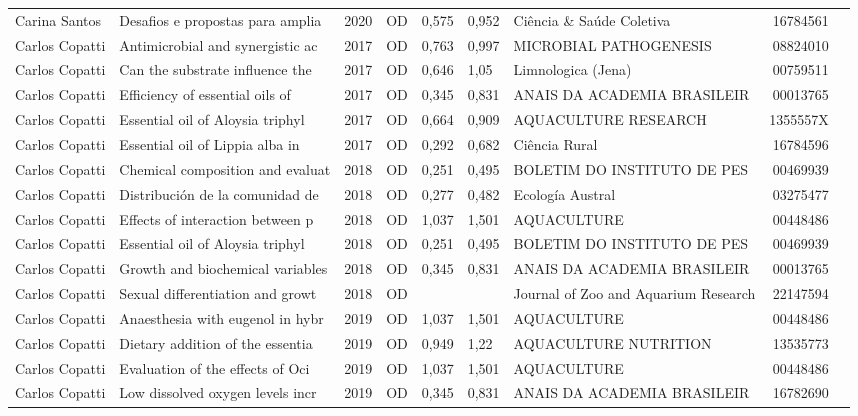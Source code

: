 \documentclass[12pt,brazil]{article}\usepackage[]{graphicx}\usepackage[]{xcolor}
\begin{document}
\begin{longtable}{lllrrllrr}
Carina Santos & Desafios e propostas para amplia & 2020 & OD & 0,575 & 0,952 & Ciência \& Saúde Coletiva & 16784561 \\
Carlos Copatti & Antimicrobial and synergistic ac & 2017 & OD & 0,763 & 0,997 & MICROBIAL PATHOGENESIS & 08824010 \\
Carlos Copatti & Can the substrate influence the  & 2017 & OD & 0,646 & 1,05 & Limnologica (Jena) & 00759511 \\
Carlos Copatti & Efficiency of essential oils of  & 2017 & OD & 0,345 & 0,831 & ANAIS DA ACADEMIA BRASILEIR & 00013765 \\
Carlos Copatti & Essential oil of Aloysia triphyl & 2017 & OD & 0,664 & 0,909 & AQUACULTURE RESEARCH & 1355557X \\
Carlos Copatti & Essential oil of Lippia alba in  & 2017 & OD & 0,292 & 0,682 & Ciência Rural & 16784596 \\
Carlos Copatti & Chemical composition and evaluat & 2018 & OD & 0,251 & 0,495 & BOLETIM DO INSTITUTO DE PES & 00469939 \\
Carlos Copatti & Distribución de la comunidad de  & 2018 & OD & 0,277 & 0,482 & Ecología Austral & 03275477 \\
Carlos Copatti & Effects of interaction between p & 2018 & OD & 1,037 & 1,501 & AQUACULTURE & 00448486 \\
\rowcolor{duplic}\rowcolor{duplic}\rowcolor{duplic}\rowcolor{duplic}\rowcolor{duplic}\rowcolor{duplic}\rowcolor{duplic}\rowcolor{duplic}\rowcolor{duplic}\rowcolor{duplic}\rowcolor{duplic}\rowcolor{duplic}\rowcolor{duplic}\rowcolor{duplic}\rowcolor{duplic}\rowcolor{duplic}Carlos Copatti & Essential oil of Aloysia triphyl & 2018 & OD & 0,251 & 0,495 & BOLETIM DO INSTITUTO DE PES & 00469939 \\
Carlos Copatti & Growth and biochemical variables & 2018 & OD & 0,345 & 0,831 & ANAIS DA ACADEMIA BRASILEIR & 00013765 \\
Carlos Copatti & Sexual differentiation and growt & 2018 & OD &  &  & Journal of Zoo and Aquarium Research & 22147594 \\
Carlos Copatti & Anaesthesia with eugenol in hybr & 2019 & OD & 1,037 & 1,501 & AQUACULTURE & 00448486 \\
Carlos Copatti & Dietary addition of the essentia & 2019 & OD & 0,949 & 1,22 & AQUACULTURE NUTRITION & 13535773 \\
Carlos Copatti & Evaluation of the effects of Oci & 2019 & OD & 1,037 & 1,501 & AQUACULTURE & 00448486 \\
Carlos Copatti & Low dissolved oxygen levels incr & 2019 & OD & 0,345 & 0,831 & ANAIS DA ACADEMIA BRASILEIR & 16782690 \\

\end{longtable}
\end{document}
